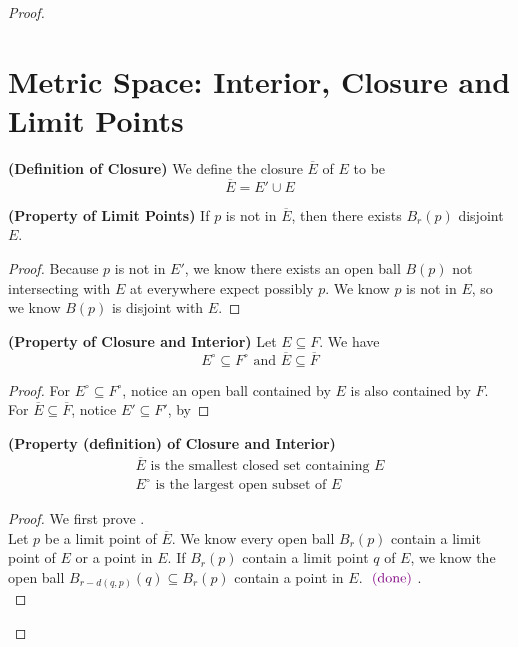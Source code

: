 \documentclass{report}
\begin{document}
\begin{proof}
\section{Metric Space: Interior, Closure and Limit Points}
\begin{definition}
\label{1.9.1}
\textbf{(Definition of Closure)} We define the closure $\overline{E}$ of $E$ to be
\begin{equation}
\overline{E}=E'\cup E
\end{equation}
\end{definition}
\begin{theorem}
\label{1.9.2}
\textbf{(Property of Limit Points)} If $p$ is not in $\overline{E}$, then there exists $B_r(p)$ disjoint $E$.
\end{theorem} 
\begin{proof}
  Because $p$ is not in $E'$, we know  there exists an open ball $B(p)$ not intersecting with  $E$ at everywhere expect possibly  $p$. We know  $p$ is not in $E$, so we know  $B(p)$ is disjoint with $E$.
\end{proof}
\begin{theorem}
\label{1.9.3}
\textbf{(Property of Closure and Interior)} Let $E\subseteq F$. We have
\begin{equation}
E^\circ \subseteq F^\circ\text{ and }\overline{E}\subseteq \overline{F}
\end{equation}
\end{theorem}
\begin{proof}
For $E^\circ \subseteq F^\circ $, notice an open ball contained by $E$ is also contained by $F$. For  $\overline{E}\subseteq \overline{F}$, notice $E'\subseteq F'$, by 
\end{proof}
\begin{theorem}
\label{1.9.4}
\textbf{(Property (definition) of Closure and Interior)} 
\begin{gather}
\text{ $\overline{E}$ is the smallest closed set containing $E$ }\\
\text{ $E^\circ $ is the largest open subset of $E$ }
\end{gather}
\end{theorem}
\begin{proof}
  We first prove .\\

  Let $p$ be a limit point of  $\overline{E}$. We know every open ball $B_r(p)$ contain a limit point of $E$ or a point in $E$. If  $B_r(p)$ contain a limit point $q$ of $E$, we know the open ball $B_{r-d(q,p)}(q)\subseteq B_r(p)$ contain a point in $E$. $\textcolor{violet}{\text{ (done) }}$.\\


\end{proof}
\end{proof}
\end{document}
